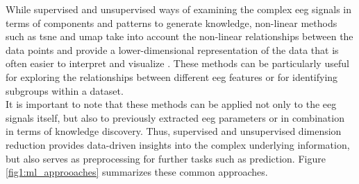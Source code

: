 While supervised and unsupervised ways of examining the complex \gls{eeg} signals in terms of components and patterns to generate knowledge, non-linear methods such as \gls{tsne} and \gls{umap} take into account the non-linear relationships between the data points and provide a lower-dimensional representation of the data that is often easier to interpret and visualize \cite{mcinnes2018umap}. These methods can be particularly useful for exploring the relationships between different \gls{eeg} features or for identifying subgroups within a dataset.\\
It is important to note that these methods can be applied not only to the \gls{eeg} signals itself, but also to previously extracted \gls{eeg} parameters or in combination in terms of knowledge discovery. Thus, supervised and unsupervised dimension reduction provides data-driven insights into the complex underlying information, but also serves as preprocessing for further tasks such as prediction. Figure \ref{fig1:ml_approoaches} summarizes these common approaches.

\begin{figure*}[h]
  \caption{State of the art approaches}
  \label{fig1:ml_approoaches}
\end{figure*}


